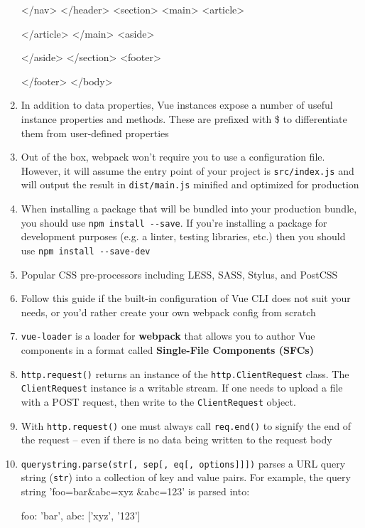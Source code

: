 \documentclass[a4paper,12pt]{article}
\begin{document}
\begin{enumerate}
\begin{htmlcode}
    </nav>
  </header>
  <section>
    <main>
      <article>

      </article>
    </main>
    <aside>

    </aside>
  </section>
  <footer>

  </footer>
</body>
\end{htmlcode}

\item In addition to data properties, Vue instances expose a number of useful instance properties and methods. These are prefixed with \$ to differentiate them from user-defined properties

\item Out of the box, webpack won't require you to use a configuration file. However, it will assume the entry point of your project is \verb|src/index.js| and will output the result in \verb|dist/main.js| minified and optimized for production

\item When installing a package that will be bundled into your production bundle, you should use \verb|npm install --save|. If you're installing a package for development purposes (e.g. a linter, testing libraries, etc.) then you should use \verb|npm install --save-dev|

\item Popular CSS pre-processors including LESS, SASS, Stylus, and PostCSS

\item Follow this guide if the built-in configuration of Vue CLI does not suit your needs, or you'd rather create your own webpack config from scratch
	
\item \verb|vue-loader| is a loader for \textbf{webpack} that allows you to author Vue components in a format called\textbf{ Single-File Components (SFCs)}
	
\item \verb|http.request()| returns an instance of the \verb|http.ClientRequest| class. The\\ \verb|ClientRequest| instance is a writable stream. If one needs to upload a file with a POST request, then write to the \verb|ClientRequest| object.	
	
\item  With \verb|http.request()| one must always call \verb|req.end()| to signify the end of the request -- even if there is no data being written to the request body	
	

\item \verb|querystring.parse(str[, sep[, eq[, options]]])| parses a URL query string (\verb|str|) into a collection of key and value pairs. For example, the query string 'foo=bar\&abc=xyz \&abc=123' is parsed into:
\begin{jscode}
{
	foo: 'bar',
	abc: ['xyz', '123']
}	
\end{jscode}


\end{enumerate}
\end{document}

